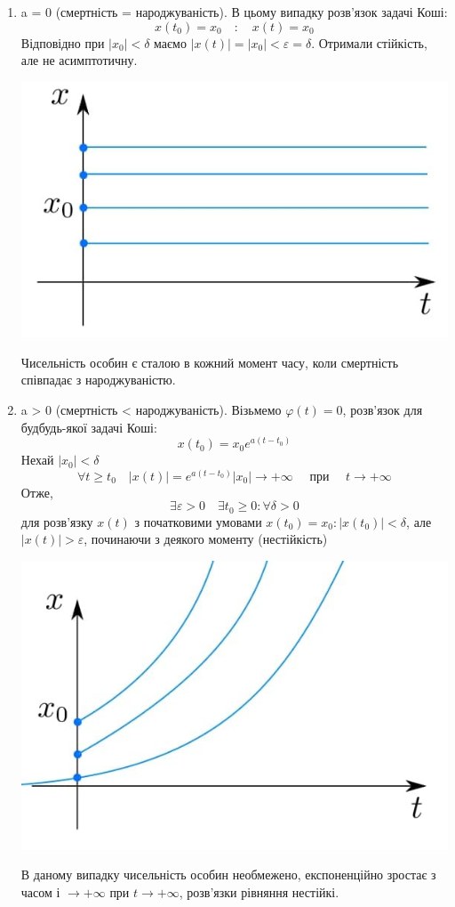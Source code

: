 \documentclass[14pt,a4paper]{scrartcl}
\theoremstyle{definition}
\theoremstyle{definition}
\theoremstyle{definition}
\begin{document}
\begin{enumerate}
  \item a = 0 (смертність = народжуваність). В цьому випадку розв'язок задачі Коші:
  $$ x(t_0) = x_0 \quad : \quad x(t) = x_ 0 $$
  Відповідно при $|x_0| < \delta$ маємо $|x(t)| = |x_0| < \varepsilon = \delta$. Отримали стійкість, але не асимптотичну.
  \begin{center}
    \includegraphics[scale=0.65]{assets/bcase.jpg}
  \end{center}
  Чисельність особин є сталою в кожний момент часу, коли смертність співпадає з народжуваністю.

  \item a > 0 (смертність < народжуваність). Візьмемо $\varphi(t) = 0$, розв'язок для будбудь-якої задачі Коші:
  $$ x(t_0) = x_0e^{a(t-t_0)}$$
  Нехай $|x_0| < \delta$
  $$\forall t \geq t_0 \quad |x(t)| = e^{a(t-t_0)}|x_0| \rightarrow +\infty \quad \text{ при } \quad t \rightarrow +\infty$$
  Отже,
  $$\exists \varepsilon > 0 \quad \exists t_0 \geq 0 : \forall \delta > 0$$ для розв'язку $x(t)$ з початковими умовами $x(t_0) = x_0 : |x(t_0)| < \delta$, але $|x(t)| > \varepsilon$, починаючи з деякого моменту (нестійкість)
  \begin{center}
    \includegraphics[scale=0.65]{assets/vcase.jpg}
  \end{center}
  В даному випадку чисельність особин необмежено, експоненційно зростає з часом і $\rightarrow +\infty$ при $t \rightarrow +\infty$, розв'язки рівняння нестійкі.
\end{enumerate}
\end{document}
